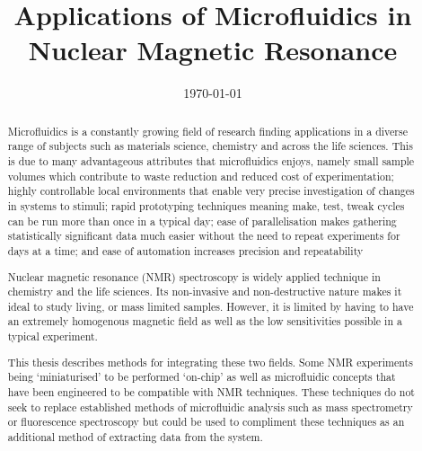 \documentclass{ecsthesis}      %
\begin{document}
\frontmatter
\title      {Applications of Microfluidics in Nuclear Magnetic Resonance}
\addresses  {\groupname\\\deptname\\\univname}
\date       {\today}
\subject    {}
\keywords   {}
\maketitle
\begin{abstract}
  Microfluidics is a constantly growing field of research finding applications in a diverse range of subjects
  such as materials science, chemistry and across the life sciences. This is due to many advantageous attributes
  that microfluidics enjoys, namely small sample volumes which contribute to waste reduction and reduced cost of
  experimentation; highly controllable local environments that enable very precise investigation of changes in
  systems to stimuli; rapid prototyping techniques meaning make, test, tweak cycles can be run more than once
  in a typical day; ease of parallelisation makes gathering statistically significant data much easier without
  the need to repeat experiments for days at a time; and ease of automation increases precision and repeatability

  Nuclear magnetic resonance (NMR) spectroscopy is widely applied technique in chemistry and the life sciences.
  Its non-invasive and non-destructive nature makes it ideal to study living, or mass limited samples. However,
  it is limited by having to have an extremely homogenous magnetic field as well as the low sensitivities possible in a
  typical experiment.

  This thesis describes methods for integrating these two fields. Some NMR experiments being ‘miniaturised’ to
  be performed ‘on-chip’ as well as microfluidic concepts that have been engineered to be compatible with NMR
  techniques. These techniques do not seek to replace established methods of microfluidic analysis such as mass
  spectrometry or fluorescence spectroscopy but could be used to compliment these techniques as an additional
  method of extracting data from the system.

\end{abstract}
\tableofcontents
\listoffigures
\listoftables
\lstlistoflistings
\end{document}
